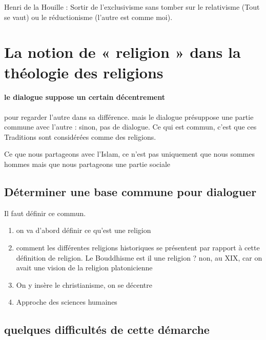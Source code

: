 Henri de la Houille : Sortir de l'exclusivisme sans tomber sur le relativisme (Tout se vaut) ou le réductionisme (l'autre est comme moi).




\section{La notion de « religion » dans la théologie des religions}


\paragraph{le dialogue suppose un certain décentrement} pour regarder l'autre dans sa différence. mais le dialogue présuppose une partie commune avec l'autre : sinon, pas de dialogue. Ce qui est commun, c'est que ces Traditions sont considérées comme des religions.

\begin{Ex}
Ce que nous partageons avec l'Islam, ce n'est pas uniquement que nous sommes hommes mais que nous partageons une partie sociale
\end{Ex}


\subsection{Déterminer une base commune pour dialoguer}



Il faut définir ce commun.

\begin{enumerate}
    \item on va d'abord définir ce qu'est une religion
    \item comment les différentes religions historiques se présentent par rapport à cette définition de religion. Le Bouddhisme est il une religion ? non, au XIX, car on avait une vision de la religion platonicienne
    \item On y insère le christianisme, on se décentre
    \item Approche des sciences humaines
\end{enumerate}

\subsection{quelques difficultés de cette démarche}

